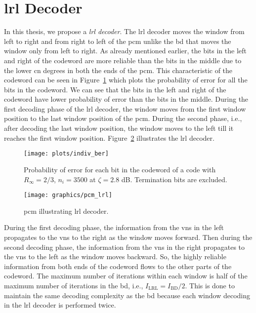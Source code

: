 \section{\texorpdfstring{\acrlong{lrl}}{LRL} Decoder}
In this thesis, we propose a \emph{\gls{lrl} decoder}. The \gls{lrl} decoder moves the window from left to right and from right to left of the \gls{pcm} unlike the \gls{bd} that moves the window only from left to right. As already mentioned earlier, the bits in the left and right of the codeword are more reliable than the bits in the middle due to the lower \gls{cn} degrees in both the ends of the \gls{pcm}. This characteristic of the codeword can be seen in Figure~\ref{fig:indiv_ber} which plots the probability of error for all the bits in the codeword. We can see that the bits in the left and right of the codeword have lower probability of error than the bits in the middle. During the first decoding phase of the \gls{lrl} decoder, the window moves from the first window position to the last window position of the \gls{pcm}. During the second phase, i.e., after decoding the last window position, the window moves to the left till it reaches the first window position. Figure~\ref{fig:pcm_lrl} illustrates the \gls{lrl} decoder.
\begin{figure}[htbp]
  \centering
  \texttt{[image: plots/indiv\_ber]}
  \caption[Probability of bit error for \acrshort{bpl} code.]{Probability of error for each bit in the codeword of a code with $R_\infty=2/3$, $n_i=3500$ at $\zeta=2.8$ dB. Termination bits are excluded.}
  \label{fig:indiv_ber}
\end{figure}

\begin{figure}[htbp]
  \centering
  \texttt{[image: graphics/pcm\_lrl]}
  \caption{\gls{pcm} illustrating \gls{lrl} decoder.}
  \label{fig:pcm_lrl}
\end{figure}
During the first decoding phase, the information from the \glspl{vn} in the left propagates to the \glspl{vn} to the right as the window moves forward. Then during the second decoding phase, the information from the \glspl{vn} in the right propagates to the \glspl{vn} to the left as the window moves backward. So, the highly reliable information from both ends of the codeword flows to the other parts of the codeword. The maximum number of iterations within each window is half of the maximum number of iterations in the \gls{bd}, i.e., $I_{\text{LRL}}=I_{\text{BD}}/2$. This is done to maintain the same decoding complexity as the \gls{bd} because each window decoding in the \gls{lrl} decoder is performed twice.

